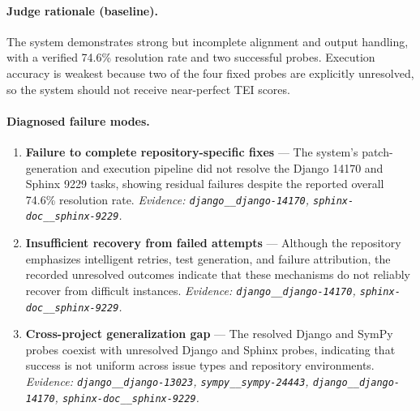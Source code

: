 \paragraph{Judge rationale (baseline).}
The system demonstrates strong but incomplete alignment and output handling, with a verified 74.6\% resolution rate and two successful probes. Execution accuracy is weakest because two of the four fixed probes are explicitly unresolved, so the system should not receive near-perfect TEI scores.
\paragraph{Diagnosed failure modes.}\begin{enumerate}\itemsep1pt
\item \textbf{Failure to complete repository-specific fixes} --- The system's patch-generation and execution pipeline did not resolve the Django 14170 and Sphinx 9229 tasks, showing residual failures despite the reported overall 74.6\% resolution rate. \emph{Evidence: \texttt{django\_\_django-14170}, \texttt{sphinx-doc\_\_sphinx-9229}.}
\item \textbf{Insufficient recovery from failed attempts} --- Although the repository emphasizes intelligent retries, test generation, and failure attribution, the recorded unresolved outcomes indicate that these mechanisms do not reliably recover from difficult instances. \emph{Evidence: \texttt{django\_\_django-14170}, \texttt{sphinx-doc\_\_sphinx-9229}.}
\item \textbf{Cross-project generalization gap} --- The resolved Django and SymPy probes coexist with unresolved Django and Sphinx probes, indicating that success is not uniform across issue types and repository environments. \emph{Evidence: \texttt{django\_\_django-13023}, \texttt{sympy\_\_sympy-24443}, \texttt{django\_\_django-14170}, \texttt{sphinx-doc\_\_sphinx-9229}.}
\end{enumerate}
